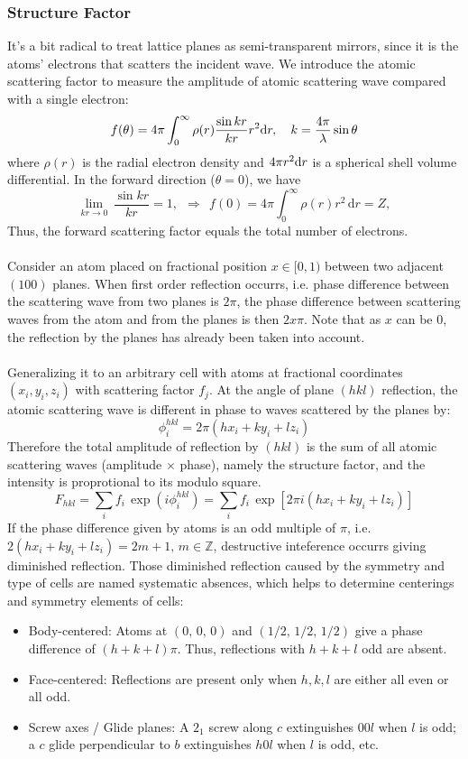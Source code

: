 \subsubsection{Structure Factor}
%
It's a bit radical to treat lattice planes as semi-transparent mirrors, 
since it is the atoms' electrons that scatters the incident wave. 
We introduce the atomic scattering factor to measure the amplitude of atomic scattering wave compared with a single electron:
%
\[
	f(\theta)=4\pi\int_{0}^{\infty}\rho(r)\frac{\sin kr}{kr}r^2\text{d} r,\quad k=\frac{4\pi}{\lambda}\sin\theta
\]
%
where $\rho(r)$ is the radial electron density and $4\pi r^2\text{d} r$ is a spherical shell volume differential.
In the forward direction ($\theta = 0$), we have
%
\[
\lim_{kr\to 0}\,\frac{\sin kr}{kr}=1, \ \ \Rightarrow\ \ 
f(0) = 4\pi\int_0^\infty \rho(r)r^2\,\mathrm{d}r = Z,
\]
%
Thus, the forward scattering factor equals the total number of electrons.\\ \\
%
Consider an atom placed on fractional position $x\in[0,1)$ between two adjacent $(100)$ planes.
When first order reflection occurrs, i.e. phase difference between the scattering wave from two planes is $2\pi$, 
the phase difference between scattering waves from the atom and from the planes is then $2x\pi$. Note that as $x$ can be 0, 
the reflection by the planes has already been taken into account.\\ \\
%
Generalizing it to an arbitrary cell with atoms at fractional coordinates $(x_i,y_i,z_i)$ with scattering factor $f_j$.
At the angle of plane $(hkl)$ reflection, the atomic scattering wave is different in phase to waves scattered by the planes by:
%
\[
	\phi_i^{hkl} = 2\pi(hx_i+ky_i+lz_i)
\]
%
Therefore the total amplitude of reflection by $(hkl)$ is the sum of all atomic scattering waves (amplitude $\times$ phase), 
namely the structure factor, and the intensity is proprotional to its modulo square.
%
\[
	F_{hkl} = \sum_i f_i\,\exp\left(i\phi_i^{hkl}\right) = \sum_i f_i\,\exp\left[2\pi i(hx_i+ky_i+lz_i)\right]
\]
%
If the phase difference given by atoms is an odd multiple of $\pi$, i.e. $2(hx_i+ky_i+lz_i)=2m+1,\,m\in\mathbb{Z}$, 
destructive inteference occurrs giving diminished reflection. 
Those diminished reflection caused by the symmetry and type of cells are named systematic absences, 
which helps to determine centerings and symmetry elements of cells:
%
\begin{itemize}
	\item Body-centered: Atoms at $(0,\,0,\,0)$ and $(1/2,\,1/2,\,1/2)$ give a phase difference of $(h+k+l)\pi$. 
			Thus, reflections with $h+k+l$ odd are absent.
	\item Face-centered: Reflections are present only when $h,k,l$ are either all even or all odd.
	\item Screw axes / Glide planes: A $2_1$ screw along $c$ extinguishes $00l$ when $l$ is odd; 
			a $c$ glide perpendicular to $b$ extinguishes $h0l$ when $l$ is odd, etc.
\end{itemize}
